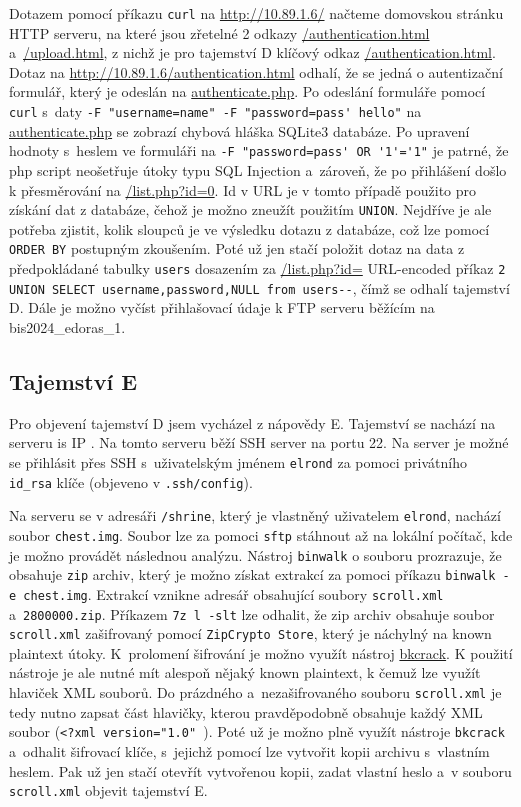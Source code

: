 \documentclass[a4paper, 11pt]{article}
\begin{document}
Dotazem pomocí příkazu \texttt{curl} na \url{http://10.89.1.6/} načteme domovskou stránku HTTP serveru, na které jsou zřetelné 2 odkazy \url{/authentication.html} a~\url{/upload.html}, z nichž je pro tajemství D klíčový odkaz \url{/authentication.html}. Dotaz na \url{http://10.89.1.6/authentication.html} odhalí, že se jedná o autentizační formulář, který je odeslán na \url{authenticate.php}. Po odeslání formuláře pomocí \texttt{curl} s~daty \verb|-F "username=name" -F "password=pass' hello"| na \url{authenticate.php} se zobrazí chybová hláška SQLite3 databáze. Po upravení hodnoty s~heslem ve formuláři na \linebreak \verb|-F "password=pass' OR '1'='1"| je patrné, že php script neošetřuje útoky typu SQL Injection a~zároveň, že po přihlášení došlo k přesměrování na \url{/list.php?id=0}. Id v URL je v tomto případě použito pro získání dat z databáze, čehož je možno zneužít použitím \verb|UNION|. Nejdříve je ale potřeba zjistit, kolik sloupců je ve výsledku dotazu z databáze, což lze pomocí \verb|ORDER BY| postupným zkoušením. Poté už jen stačí položit dotaz na data z předpokládané tabulky \verb|users| dosazením za \url{/list.php?id=} URL-encoded příkaz \linebreak \verb|2 UNION SELECT username,password,NULL from users--|, čímž se odhalí tajemství D. Dále je možno vyčíst přihlašovací údaje k FTP serveru běžícím na bis2024\_edoras\_1.


\subsection{Tajemství E}
Pro objevení tajemství D jsem vycházel z nápovědy E. Tajemství se nachází na serveru  is IP . Na tomto serveru běží SSH server na portu 22. Na server je možné se přihlásit přes SSH s~uživatelským jménem \texttt{elrond} za pomoci privátního \texttt{id\_rsa} klíče (objeveno v \texttt{.ssh/config}).

Na serveru se v adresáři \texttt{/shrine}, který je vlastněný uživatelem \texttt{elrond}, nachází soubor \texttt{chest.img}. Soubor lze za pomoci \texttt{sftp} stáhnout až na lokální počítač, kde je možno provádět následnou analýzu. Nástroj \texttt{binwalk} o souboru prozrazuje, že obsahuje \texttt{zip} archiv, který je možno získat extrakcí za pomoci příkazu \verb|binwalk -e chest.img|. Extrakcí vznikne adresář obsahující soubory \texttt{scroll.xml} a~\texttt{2800000.zip}. Příkazem \verb|7z l -slt| lze odhalit, že zip archiv obsahuje soubor \texttt{scroll.xml} zašifrovaný pomocí \texttt{ZipCrypto Store}, který je náchylný na known plaintext útoky. K~prolomení šifrování je možno využít nástroj \href{https://github.com/kimci86/bkcrack}{bkcrack}. K použití nástroje je ale nutné mít alespoň nějaký known plaintext, k čemuž lze využít hlaviček XML souborů. Do prázdného a~nezašifrovaného souboru \texttt{scroll.xml} je tedy nutno zapsat část hlavičky, kterou pravděpodobně obsahuje každý XML soubor (\verb|<?xml version="1.0" |). Poté už je možno plně využít nástroje \texttt{bkcrack} a~odhalit šifrovací klíče, s~jejichž pomocí lze vytvořit kopii archivu s~vlastním heslem. Pak už jen stačí otevřít vytvořenou kopii, zadat vlastní heslo a~v souboru \texttt{scroll.xml} objevit tajemství E.   
\end{document}

